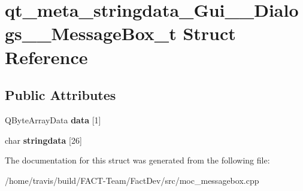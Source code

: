 \hypertarget{structqt__meta__stringdata__Gui____Dialogs____MessageBox__t}{\section{qt\-\_\-meta\-\_\-stringdata\-\_\-\-Gui\-\_\-\-\_\-\-Dialogs\-\_\-\-\_\-\-Message\-Box\-\_\-t Struct Reference}
\label{structqt__meta__stringdata__Gui____Dialogs____MessageBox__t}
}
\subsection*{Public Attributes}
\begin{DoxyCompactItemize}
\item 
\hypertarget{structqt__meta__stringdata__Gui____Dialogs____MessageBox__t_addd287ab9b5f6aaed4476baeb0c3115a}{Q\-Byte\-Array\-Data {\bfseries data} \mbox{[}1\mbox{]}}\label{structqt__meta__stringdata__Gui____Dialogs____MessageBox__t_addd287ab9b5f6aaed4476baeb0c3115a}

\item 
\hypertarget{structqt__meta__stringdata__Gui____Dialogs____MessageBox__t_a5a90c943035217097ca0fb52f002b28c}{char {\bfseries stringdata} \mbox{[}26\mbox{]}}\label{structqt__meta__stringdata__Gui____Dialogs____MessageBox__t_a5a90c943035217097ca0fb52f002b28c}

\end{DoxyCompactItemize}


The documentation for this struct was generated from the following file\-:\begin{DoxyCompactItemize}
\item 
/home/travis/build/\-F\-A\-C\-T-\/\-Team/\-Fact\-Dev/src/moc\-\_\-messagebox.\-cpp\end{DoxyCompactItemize}
